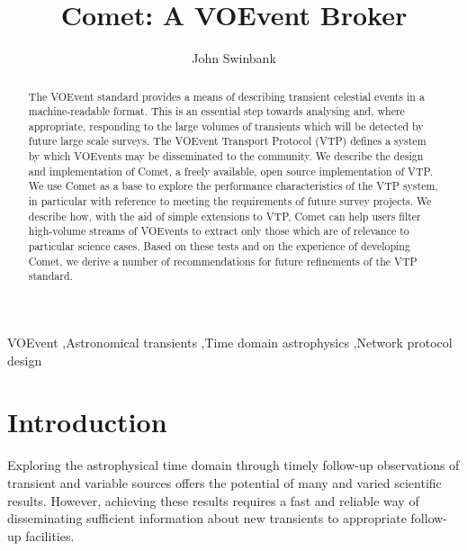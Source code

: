 \documentclass[5p,authoryear]{elsarticle}
\begin{document}
\begin{frontmatter}

\title{Comet: A VOEvent Broker}

\author{John Swinbank}

\address{Anton Pannekoek Institute, University of Amsterdam, Postbus 94249, 1090 GE Amsterdam, The Netherlands}

\begin{abstract}

The VOEvent standard provides a means of describing transient celestial events
in a machine-readable format. This is an essential step towards analysing and,
where appropriate, responding to the large volumes of transients which will be
detected by future large scale surveys. The VOEvent Transport Protocol (VTP)
defines a system by which VOEvents may be disseminated to the community. We
describe the design and implementation of Comet, a freely available, open
source implementation of VTP\@. We use Comet as a base to explore the
performance characteristics of the VTP system, in particular with reference to
meeting the requirements of future survey projects. We describe how, with the
aid of simple extensions to VTP, Comet can help users filter high-volume
streams of VOEvents to extract only those which are of relevance to particular
science cases.  Based on these tests and on the experience of developing
Comet, we derive a number of recommendations for future refinements of the VTP
standard.

\end{abstract}

\begin{keyword}
VOEvent \sep Astronomical transients \sep Time domain astrophysics \sep Network protocol design
\end{keyword}

\end{frontmatter}

\section{Introduction}
\label{sec:intro}

Exploring the astrophysical time domain through timely follow-up observations
of transient and variable sources offers the potential of many and varied
scientific results. However, achieving these results requires a fast and
reliable way of disseminating sufficient information about new transients to
appropriate follow-up facilities.
\end{document}
